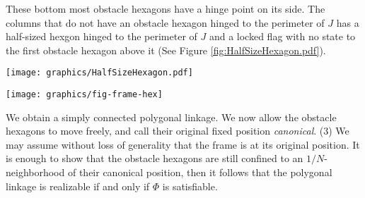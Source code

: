 \begin{enumerate}
These bottom most obstacle hexagons have a hinge point on its side.
The columns that do not have an obstacle hexagon hinged to the perimeter of $J$ has a half-sized hexgon hinged to the perimeter of $J$ and a locked flag with no state to the first obstacle hexagon above it (See Figure \ref{fig:HalfSizeHexagon.pdf}).

\begin{minipage}{\linewidth}
\begin{center}
\texttt{[image: graphics/HalfSizeHexagon.pdf]}
\label{fig:HalfSizeHexagon.pdf}
\end{center}
\end{minipage}

\end{enumerate}

\begin{minipage}{\linewidth}
	\begin{center}
	\texttt{[image: graphics/fig-frame-hex]}
	\label{fig:frame}
	\end{center}
\end{minipage}
We obtain a simply connected polygonal linkage. 
We now allow the obstacle hexagons to move freely, and call their original fixed position \emph{canonical}. 
\noindent (3) We may assume without loss of generality that the frame is at its original position. 
It is enough to show that the obstacle hexagons are still confined to an $1/N$-neighborhood of their canonical position, then it
follows that the polygonal linkage is realizable if and only if $\Phi$ is satisfiable.


